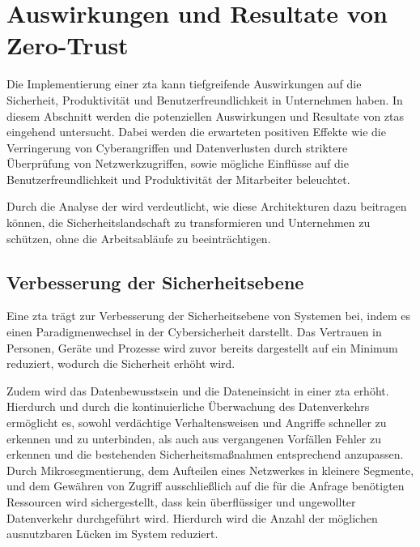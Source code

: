 \newpage
\section{Auswirkungen und Resultate von Zero-Trust}\label{sec:auswirkungen-und-resultate-von-zero-trust}
Die Implementierung einer \ac{zta} kann tiefgreifende Auswirkungen auf die Sicherheit, Produktivität und Benutzerfreundlichkeit in Unternehmen haben.
In diesem Abschnitt werden die potenziellen Auswirkungen und Resultate von \acp{zta} eingehend untersucht.
Dabei werden die erwarteten positiven Effekte wie die Verringerung von Cyberangriffen und Datenverlusten durch striktere Überprüfung von Netzwerkzugriffen, sowie mögliche Einflüsse auf die Benutzerfreundlichkeit und Produktivität der Mitarbeiter beleuchtet.

Durch die Analyse der   wird verdeutlicht, wie diese Architekturen dazu beitragen können, die Sicherheitslandschaft zu transformieren und Unternehmen zu schützen, ohne die Arbeitsabläufe zu beeinträchtigen.

\subsection{Verbesserung der Sicherheitsebene}\label{subsec:verbesserung-der-sicherheitsebene}
Eine \ac{zta} trägt zur Verbesserung der Sicherheitsebene von Systemen bei, indem es einen Paradigmenwechsel in der Cybersicherheit darstellt.
Das Vertrauen in Personen, Geräte und Prozesse wird zuvor bereits dargestellt auf ein Minimum reduziert, wodurch die Sicherheit erhöht wird.

Zudem wird das Datenbewusstsein und die Dateneinsicht in einer \ac{zta} erhöht.
Hierdurch und durch die kontinuierliche Überwachung des Datenverkehrs ermöglicht es, sowohl verdächtige Verhaltensweisen und Angriffe schneller zu erkennen und zu unterbinden, als auch aus vergangenen Vorfällen Fehler zu erkennen und die bestehenden Sicherheitsmaßnahmen entsprechend anzupassen.\autocites[\vglf][]{cunningham-2019}[\vglf][]{buck-2021}
Durch Mikrosegmentierung, dem Aufteilen eines Netzwerkes in kleinere Segmente, und dem Gewähren von Zugriff ausschließlich auf die für die Anfrage benötigten Ressourcen wird sichergestellt, dass kein überflüssiger und ungewollter Datenverkehr durchgeführt wird.\autocite[\vglf][]{shore-2021}
Hierdurch wird die Anzahl der möglichen ausnutzbaren Lücken im System reduziert.

